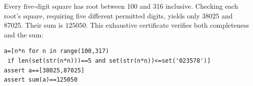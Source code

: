 Every five-digit square has root between 100 and 316 inclusive. Checking each root's square, requiring five different permitted digits, yields only 38025 and 87025. Their sum is $\boxed{125050}$. This exhaustive certificate verifies both completeness and the sum:
\begin{verbatim}
a=[n*n for n in range(100,317)
 if len(set(str(n*n)))==5 and set(str(n*n))<=set('023578')]
assert a==[38025,87025]
assert sum(a)==125050
\end{verbatim}
